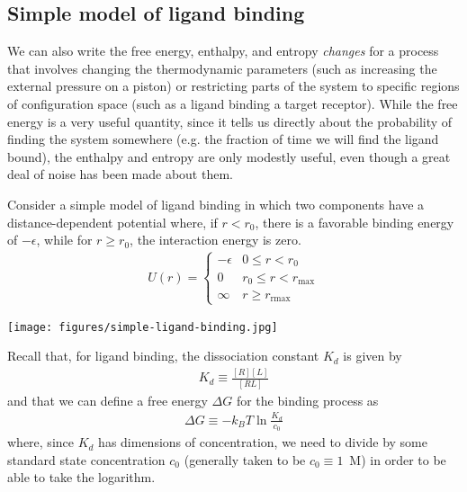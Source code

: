 \documentclass[english,course]{lecture}
\begin{document}
\subsection{Simple model of ligand binding}

We can also write the free energy, enthalpy, and entropy \emph{changes} for a process that involves changing the thermodynamic parameters (such as increasing the external pressure on a piston) or restricting parts of the system to specific regions of configuration space (such as a ligand binding a target receptor).
While the free energy is a very useful quantity, since it tells us directly about the probability of finding the system somewhere (e.g. the fraction of time we will find the ligand bound), the enthalpy and entropy are only modestly useful, even though a great deal of noise has been made about them.

Consider a simple model of ligand binding in which two components have a distance-dependent potential where, if $r < r_0$, there is a favorable binding energy of $-\epsilon$, while for $r \ge r_0$, the interaction energy is zero.
\begin{eqnarray}
U(r) = \begin{cases}
-\epsilon & 0 \le r < r_0 \\
0 & r_0 \le r < r_\mathrm{max} \\
\infty & r \ge r_\mathrm{rmax}
\end{cases}
\end{eqnarray}

\begin{centering}
\texttt{[image: figures/simple-ligand-binding.jpg]}

\end{centering}

Recall that, for ligand binding, the dissociation constant $K_d$ is given by
\begin{eqnarray}
K_d \equiv \frac{[R][L]}{[RL]}
\end{eqnarray}
and that we can define a free energy $\Delta G$ for the binding process as
\begin{eqnarray}
\Delta G \equiv - k_B T \ln \frac{K_d}{c_0}
\end{eqnarray}
where, since $K_d$ has dimensions of concentration, we need to divide by some standard state concentration $c_0$ (generally taken to be $c_0 \equiv 1$~M) in order to be able to take the logarithm.
\end{document}
